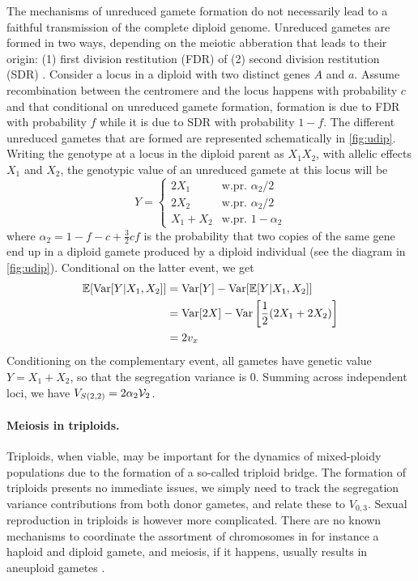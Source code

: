 \documentclass[11pt,a4paper]{article}
\begin{document}
The mechanisms of unreduced gamete formation do not necessarily lead to a
faithful transmission of the complete diploid genome.
Unreduced gametes are formed in two ways, depending on the meiotic abberation
that leads to their origin: (1) first division restitution (FDR) of (2) second
division restitution (SDR) \citep{bretagnolle1995,storme2013}.
Consider a locus in a diploid with two distinct genes $A$ and $a$. Assume
recombination between the centromere and the locus happens with probability $c$
and that conditional on unreduced gamete formation, formation is due to FDR
with probability $f$ while it is due to SDR with probability $1-f$.
The different unreduced gametes that are formed are represented schematically
in \cref{fig:udip}.
Writing the genotype at a locus in the diploid parent as $X_1X_2$, with allelic
effects $X_1$ and $X_2$, the genotypic value of an unreduced gamete at this
locus will be
$$Y = \begin{cases}
    2X_1 & \text{w.pr.  } \alpha_2/2 \\
    2X_2 & \text{w.pr.  } \alpha_2/2 \\
    X_1 + X_2 & \text{w.pr.  } 1-\alpha_2 
    \end{cases}$$
where $\alpha_2 = 1 - f - c + \frac{3}{2}cf$ is the probability that two copies
of the same gene end up in a diploid gamete produced by a diploid individual
(see the diagram in \cref{fig:udip}). 
Conditional on the latter event, we get
\begin{align*}
\mathbb{E}[\mathrm{Var}[Y|X_1,X_2]] &= \mathrm{Var}[Y] - \mathrm{Var}[\mathbb{E}[Y|X_1,X_2]] \\
    &= \mathrm{Var}[2X] - \mathrm{Var}\left[\frac{1}{2}(2X_1 + 2X_2)\right] \\
    &= 2v_x
\end{align*}
Conditioning on the complementary event, all gametes have genetic value
$Y = X_1+X_2$, so that the segregation variance is 0.
Summing across independent loci, we have $V_{S(2,2)} = 2\alpha_2 \mathcal{V}_{2}$.


\paragraph{Meiosis in triploids.}

Triploids, when viable, may be important for the dynamics of mixed-ploidy
populations due to the formation of a so-called triploid bridge.
The formation of triploids presents no immediate issues, we simply need to
track the segregation variance contributions from both donor gametes, and
relate these to $V_{0,3}$.
Sexual reproduction in triploids is however more complicated.
There are no known mechanisms to coordinate the assortment of chromosomes in
for instance a haploid and diploid gamete, and meiosis, if it happens, usually
results in aneuploid gametes \citep{ramsey1998}.
\end{document}
